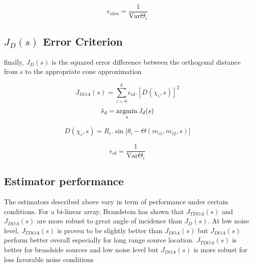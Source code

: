 \begin{equation}
\epsilon_{idoa}=\frac{1}{\mathrm{Var}{\Theta_{i}}}
\label{eq:epsilonjtdoa}
\end{equation}

\subsection{$J_{D}(s)$ Error Criterion}

finally, $J_{D}(s)$ is the squared error difference between the orthogonal distance from s to the appropriate cone approximation 

\begin{equation}
J_{DOA}(s) = {\sum}_{i=0}^k \epsilon_{id}.[D(\chi_{i},s)]^2
\label{eq:jd}
\end{equation}
\begin{equation}
\hat{s}_{d}= \argmin_{s} J_{d}(s) 
\end{equation}


\begin{equation}
D(\chi_{i},s)=R_{i}.\sin{[\theta_{i}-\Theta(m_{i1},m_{i2},s)}]  
\end{equation}

\begin{equation}
 \epsilon_{id}=\frac{1}{\mathrm{Var}{\Theta_{i}}}    
\end{equation}

\subsection{Estimator performance}

The estimators described above vary in term of performance under certain conditions. For a bi-linear array, Brandstein has shown that $J_{TDOA}(s)$ and $J_{DOA}(s)$ are more robust to great angle of incidence than $J_{D}(s)$. At low noise level, $J_{TDOA}(s)$ is proven to be slightly better than $J_{DOA}(s)$ but $J_{DOA}(s)$ perform better overall especially for long range source location. $J_{TDOA}(s)$ is better for broadside sources and low noise level but $J_{DOA}(s)$ is more robust for less favorable noise conditions

\fi
